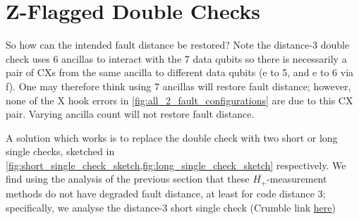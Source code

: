 \section{Z-Flagged Double Checks}\label{sec:z_flagged_double_checks}

So how can the intended fault distance be restored?
Note the distance-3 double check uses 6 ancillas
to interact with the 7 data qubits
so there is necessarily a pair of CXs
from the same ancilla to different data qubits (e to 5, and e to 6 via f).
One may therefore think using 7 ancillas will restore fault distance;
however,
none of the X hook errors in \cref{fig:all_2_fault_configurations}
are due to this CX pair.
Varying ancilla count will not restore fault distance.

A solution which works is to replace the double check
with two short or long single checks,
sketched in \cref{fig:short_single_check_sketch,fig:long_single_check_sketch}
respectively.
We find
using the analysis of the previous section
that these $\overline{H_+}$-measurement methods
do not have degraded fault distance,
at least for code distance 3;
specifically, we analyse the distance-3 short single check
(Crumble link \href{https://algassert.com/crumble\#circuit=Q(0,0)0;Q(0,1)1;Q(0,2)2;Q(0,3)3;Q(0,4)4;Q(1,0)5;Q(1,1)6;Q(1,3)7;Q(1,4)8;Q(2,0)9;Q(2,1)10;Q(2,2)11;Q(2,3)12;Q(2,4)13;Q(3,0)14;Q(3,1)15;Q(3,2)16;Q(3,3)17;Q(3,4)18;Q(4,0)19;Q(4,1)20;Q(4,2)21;Q(4,3)22;Q(4,4)23;MPP_Y6*Y10*Y15*Y11*Y17*Y12*Y7;POLYGON(0,0,1,0.25)7_6_11_12;POLYGON(0,1,0,0.25)10_12_17;POLYGON(1,0,0,0.25)6_11_15;TICK;MPP_X6*X11*X12*X7;TICK;MPP_X6*X10*X15*X11;TICK;MPP_X11*X10*X17*X12;TICK;MPP_Z6*Z11*Z12*Z7;TICK;MPP_Z6*Z10*Z15*Z11;TICK;MPP_Z11*Z10*Z17*Z12;TICK;R_23;RX_22;TICK;CX_22_23;R_21_18;TICK;CX_22_21_23_18;R_13_20;TICK;CX_18_13_21_20;MX_22_23;R_8_19;TICK;CX_13_8_20_19;R_4_14;TICK;CX_8_4_19_14;MX_20;R_9_3;TICK;CX_14_9_4_3;MX_8_19;R_5_2;TICK;CX_3_2_9_5;MX_4;R_0_1_16;TICK;CX_5_0_2_1_21_16;TICK;CX_1_0;MX_5_2_21;S_6_10_12;S_DAG_7_11_17_15;TICK;CX_1_6_3_7_13_12_18_17_9_10_14_15_16_11;M_0;DT(0,0,0)rec[-1];TICK;MX_1_9_14_16_3_13_18;S_11_7_17_15;S_DAG_10_6_12;DT(1,1,1)rec[-1]_rec[-2]_rec[-3]_rec[-4]_rec[-5]_rec[-6]_rec[-7]_rec[-9]_rec[-10]_rec[-11]_rec[-12]_rec[-13]_rec[-14]_rec[-15]_rec[-16]_rec[-17]_rec[-24];TICK;MPP_X6*X11*X12*X7;DT(1,1,2)rec[-1]_rec[-24];TICK;MPP_X6*X10*X15*X11;DT(1,1,3)rec[-1]_rec[-24];TICK;MPP_X11*X10*X17*X12;DT(2,2,4)rec[-1]_rec[-11]_rec[-24];TICK;MPP_Z6*Z11*Z12*Z7;DT(1,1,5)rec[-1]_rec[-24];TICK;MPP_Z6*Z10*Z15*Z11;DT(1,1,6)rec[-1]_rec[-24];TICK;MPP_Z11*Z10*Z17*Z12;DT(2,2,7)rec[-1]_rec[-14]_rec[-24];TICK;MPP_Y6*Y10*Y15*Y11*Y17*Y12*Y7;OI(0)rec[-1]_rec[-8]_rec[-9]_rec[-10]_rec[-11]_rec[-12]_rec[-13]_rec[-14]_rec[-16]_rec[-17]_rec[-18]_rec[-19]_rec[-20]_rec[-21]_rec[-22]_rec[-23]_rec[-24]}{here})

